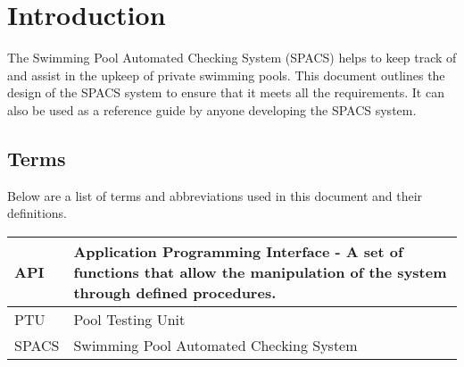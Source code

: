 \section{Introduction}

\par
The Swimming Pool Automated Checking System (SPACS) helps to keep track of and assist in the upkeep of private swimming pools. This document outlines the design of the SPACS system to ensure that it meets all the requirements. It can also be used as a reference guide by anyone developing the SPACS system.

\subsection{Terms}
\par
Below are a list of terms and abbreviations used in this document and their definitions.

\begin{center}
\begin{tabular}{| l | p{13cm} |}
\hline
API & Application Programming Interface - A set of functions that allow the manipulation of the system through defined procedures. \\ \hline
PTU & Pool Testing Unit \\ \hline
SPACS & Swimming Pool Automated Checking System \\ \hline
\end{tabular}
\end{center}
